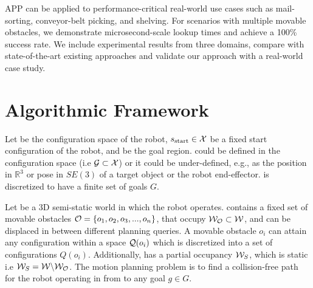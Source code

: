 \documentclass[a4paper]{report}
\begin{document}
APP can be applied to performance-critical real-world use cases such as mail-sorting, conveyor-belt picking, and shelving. 
For scenarios with multiple movable obstacles, we demonstrate microsecond-scale lookup times and achieve a 100\% success rate. We include experimental results from three domains, compare with state-of-the-art existing approaches and validate our approach with a real-world case study. 

\section{Algorithmic Framework}
\label{subsec:setup}
Let \calX be the configuration space of the robot, $s_{\textrm{start}} \in \mathcal{X}$ be a fixed start configuration of the robot, and \calG be the goal region. 
\calG could be defined in the configuration space \calX (i.e $\mathcal{G} \subset \mathcal{X}$) or it could be under-defined, e.g., as the position in $\mathbb{R}^3$ or pose in $SE(3)$ of a target object or the robot end-effector. \calG is discretized to have a finite set of goals $G$. 

Let \calW be a 3D semi-static world in which the robot operates. \calW contains a fixed set of movable obstacles $\mathcal{O} = \{o_1, o_2, o_3,...,o_n\}$, that occupy $\mathcal{W}_\mathcal{O} \subset \mathcal{W}$, and can be displaced in between different planning queries. A movable obstacle $o_i$ can attain any configuration within a space $\mathcal{Q}(o_i)$ which is discretized into a set of configurations $Q(o_i)$. Additionally, \calW has a partial occupancy $\mathcal{W}_S$, which is static i.e $\mathcal{W}_S = \mathcal{W} \backslash \mathcal{W}_\mathcal{O}$. The motion planning problem is to find a collision-free path for the robot operating in \calW from \Sstart to any goal $g \in G$.

\end{document}
